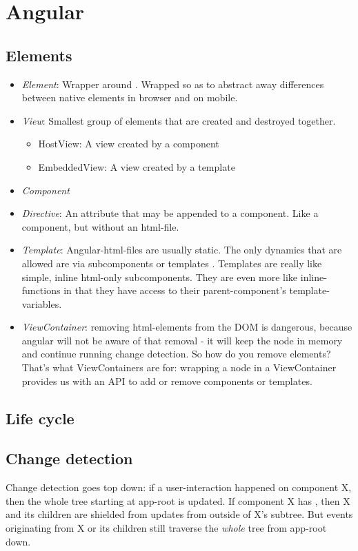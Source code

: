 \section{Angular}


\subsection{Elements}

\begin{itemize}
    \item \emph{Element}: Wrapper around . Wrapped so as to abstract away differences between native elements in browser and on mobile.
    \item \emph{View}: Smallest group of elements that are created and destroyed together.
        \begin{itemize}
            \item HostView: A view created by a component
            \item EmbeddedView: A view created by a template
        \end{itemize}
    \item \emph{Component}
    \item \emph{Directive}: An attribute that may be appended to a component. Like a component, but without an html-file.
    \item \emph{Template}: Angular-html-files are usually static. The only dynamics that are allowed are via subcomponents or templates . Templates are really like simple, inline html-only subcomponents. They are even more like inline-functions in that they have access to their parent-component's template-variables.
    \item \emph{ViewContainer}: removing html-elements from the DOM is dangerous, because angular will not be aware of that removal - it will keep the node in memory and continue running change detection. So how do you remove elements? That's what ViewContainers are for: wrapping a node in a ViewContainer provides us with an API to add or remove components or templates.
\end{itemize}

\subsection{Life cycle}

\subsection{Change detection}
Change detection goes top down: if a user-interaction happened on component X, then the whole tree starting at app-root is updated.
If component X has , then X and its children are shielded from updates from outside of X's subtree. But events originating from X or its children still traverse the \emph{whole} tree from app-root down.

